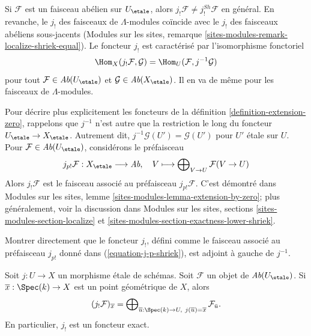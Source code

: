 \noindent
Si $\mathcal{F}$ est un faisceau abélien sur $U_\etale$, alors
$j_!\mathcal{F} \not = j_!^{Sh}\mathcal{F}$ en général. En revanche,
le $j_!$ des faisceaux de $\Lambda$-modules coïncide avec le $j_!$ des
faisceaux abéliens sous-jacents
(Modules sur les sites, remarque \ref{sites-modules-remark-localize-shriek-equal}).
Le foncteur $j_!$ est caractérisé par l'isomorphisme fonctoriel
$$
\Hom_X(j_!\mathcal{F}, \mathcal{G}) = \Hom_U(\mathcal{F}, j^{-1}\mathcal{G})
$$
pour tout $\mathcal{F} \in \textit{Ab}(U_\etale)$ et
$\mathcal{G} \in \textit{Ab}(X_\etale)$. Il en va de même pour les
faisceaux de $\Lambda$-modules.

\medskip\noindent
Pour décrire plus explicitement les foncteurs de la définition \ref{definition-extension-zero},
rappelons que $j^{-1}$ n'est autre que la restriction
le long du foncteur $U_\etale \to X_\etale$. Autrement dit,
$j^{-1}\mathcal{G}(U') = \mathcal{G}(U')$ pour $U'$ étale sur $U$.
Pour $\mathcal{F} \in \textit{Ab}(U_\etale)$, considérons le
préfaisceau
\begin{equation}
\label{equation-j-p-shriek}
j_{p!}\mathcal{F} : X_\etale \longrightarrow \textit{Ab},
\quad
V \longmapsto \bigoplus\nolimits_{V \to U} \mathcal{F}(V \to U)
\end{equation}
Alors $j_!\mathcal{F}$ est le faisceau associé au préfaisceau $j_{p!}\mathcal{F}$.
C'est démontré dans Modules sur les sites, lemme
\ref{sites-modules-lemma-extension-by-zero};
plus généralement, voir la discussion dans
Modules sur les sites, sections \ref{sites-modules-section-localize} et
\ref{sites-modules-section-exactness-lower-shriek}.

\begin{exercise}
\label{exercise-jshriek-direct}
Montrer directement que le foncteur $j_!$, défini comme le faisceau associé au
préfaisceau $j_{p!}$ donné dans
(\ref{equation-j-p-shriek}), est adjoint à gauche de $j^{-1}$.
\end{exercise}

\begin{proposition}
\label{proposition-describe-jshriek}
Soit $j : U \to X$ un morphisme étale de schémas.
Soit $\mathcal{F}$ un objet de $\textit{Ab}(U_\etale)$.
Si $\overline{x} : \Spec(k) \to X$ est un point géométrique de $X$, alors
$$
(j_!\mathcal{F})_{\overline{x}} =
\bigoplus\nolimits_{\overline{u} : \Spec(k) \to U,\ j(\overline{u}) =
\overline{x}} \mathcal{F}_{\bar{u}}.
$$
En particulier, $j_!$ est un foncteur exact.
\end{proposition}

